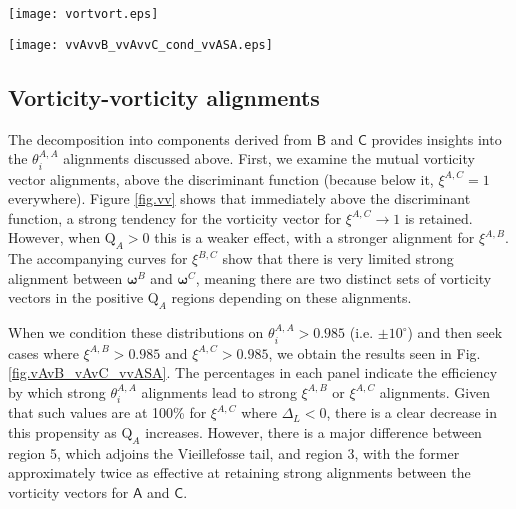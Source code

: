 \documentclass[preprint,amssymb,amsmath,aip,cha]{revtex4-1}
\begin{document}
\begin{figure*}
  \texttt{[image: vortvort.eps]}
\caption{The probability of attaining different values for $\xi$ as a function of the four regions of the $\mbox{Q}_{A}-\mbox{R}_{A}$ diagram where $\boldsymbol{\omega}^{B}$ is non-zero
}
\label{fig.vv}   
\end{figure*}

\begin{figure*}
  \texttt{[image: vvAvvB\_vvAvvC\_cond\_vvASA.eps]}
\caption{Given $\theta^{A,A}_{i} > 0.985$ and that $\boldsymbol{\omega}_{B}$ exists, results are shown for cases where $\xi^{A,B} > 0.985$ (light grey) and $\xi^{A,C} > 0.985$ (grey) for the various $i$ in the $\theta^{A,A}_{i}$ alignment. The values in each panel sum to 1 and the percentage value in each panel gives the relative frequency that $\theta^{A,A}_{i} > 0.985$ leads to $\xi^{A,B} > 0.985$ or $\xi^{A,C} > 0.985$.
}
\label{fig.vAvB_vAvC_vvASA}   
\end{figure*}

\subsection{Vorticity-vorticity alignments}
The decomposition into components derived from $\mathsf{B}$ and $\mathsf{C}$ provides insights into the $\theta^{A,A}_{i}$ alignments discussed above. First, we examine the mutual vorticity vector alignments, above the discriminant function (because below it, $\xi^{A,C} = 1$ everywhere). Figure \ref{fig.vv} shows that immediately above the discriminant function, a strong tendency for the vorticity vector for $\xi^{A,C} \to 1$ is retained. However, when $\mbox{Q}_{A} > 0$ this is a weaker effect, with a stronger alignment for $\xi^{A,B}$. The accompanying curves for $\xi^{B,C}$ show that there is very limited strong alignment between $\boldsymbol{\omega}^{B}$ and $\boldsymbol{\omega}^{C}$, meaning there are two distinct sets of vorticity vectors in the positive $\mbox{Q}_{A}$ regions depending on these alignments.

When we condition these distributions on $\theta^{A,A}_{i} > 0.985$ (i.e. $\pm 10^{\circ}$) and then seek cases where $\xi^{A,B} > 0.985$ and $\xi^{A,C} > 0.985$, we obtain the results seen in Fig. \ref{fig.vAvB_vAvC_vvASA}. The percentages in each panel indicate the efficiency by which strong $\theta^{A,A}_{i}$ alignments lead to strong $\xi^{A,B}$ or $\xi^{A,C}$ alignments. Given that such values are at 100\% for $\xi^{A,C}$ where $\Delta_{L} < 0$, there is a clear decrease in this propensity as $\mbox{Q}_{A}$ increases. However, there is a major difference between region 5, which adjoins the Vieillefosse tail, and region 3, with the former approximately twice as effective at retaining strong alignments between the vorticity vectors for $\mathsf{A}$ and $\mathsf{C}$. 
\end{document}
